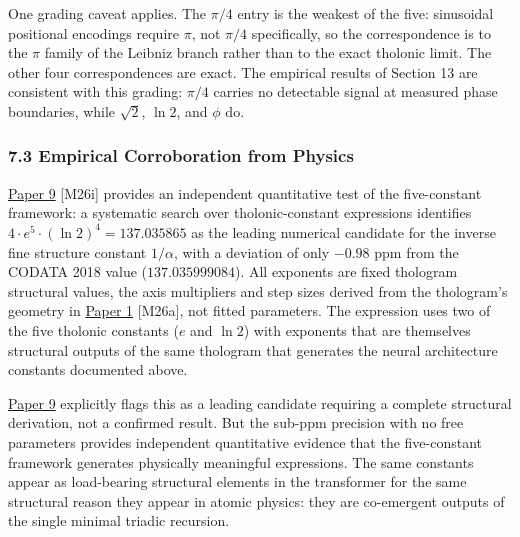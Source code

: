 \documentclass[
  11pt,
  letterpaper,
]{article}
\begin{document}
One grading caveat applies. The \(\pi/4\) entry is the weakest of the
five: sinusoidal positional encodings require \(\pi\), not \(\pi/4\)
specifically, so the correspondence is to the \(\pi\) family of the
Leibniz branch rather than to the exact tholonic limit. The other four
correspondences are exact. The empirical results of Section 13 are
consistent with this grading: \(\pi/4\) carries no detectable signal at
measured phase boundaries, while \(\sqrt{2}\), \(\ln 2\), and \(\phi\)
do.

\subsubsection{7.3 Empirical Corroboration from
Physics}\label{empirical-corroboration-from-physics}

\href{https://github.com/baardev/truevalue/blob/main/docnav/Research/papers/9_tholonic-model-standard-model-alternative/9_tholonic-model-standard-model-alternative.pdf}{Paper
9} {[}M26i{]} provides an independent quantitative test of the
five-constant framework: a systematic search over tholonic-constant
expressions identifies \(4 \cdot e^5 \cdot (\ln 2)^4 = 137.035865\) as
the leading numerical candidate for the inverse fine structure constant
\(1/\alpha\), with a deviation of only \(-0.98\) ppm from the CODATA
2018 value (\(137.035999084\)). All exponents are fixed thologram
structural values, the axis multipliers and step sizes derived from the
thologram's geometry in
\href{https://github.com/baardev/truevalue/blob/main/docnav/Research/papers/1_recursive-tholonic-five-constants/1_recursive-tholonic-five-constants.pdf}{Paper
1} {[}M26a{]}, not fitted parameters. The expression uses two of the
five tholonic constants (\(e\) and \(\ln 2\)) with exponents that are
themselves structural outputs of the same thologram that generates the
neural architecture constants documented above.

\href{https://github.com/baardev/truevalue/blob/main/docnav/Research/papers/9_tholonic-model-standard-model-alternative/9_tholonic-model-standard-model-alternative.pdf}{Paper
9} explicitly flags this as a leading candidate requiring a complete
structural derivation, not a confirmed result. But the sub-ppm precision
with no free parameters provides independent quantitative evidence that
the five-constant framework generates physically meaningful expressions.
The same constants appear as load-bearing structural elements in the
transformer for the same structural reason they appear in atomic
physics: they are co-emergent outputs of the single minimal triadic
recursion.
\end{document}
